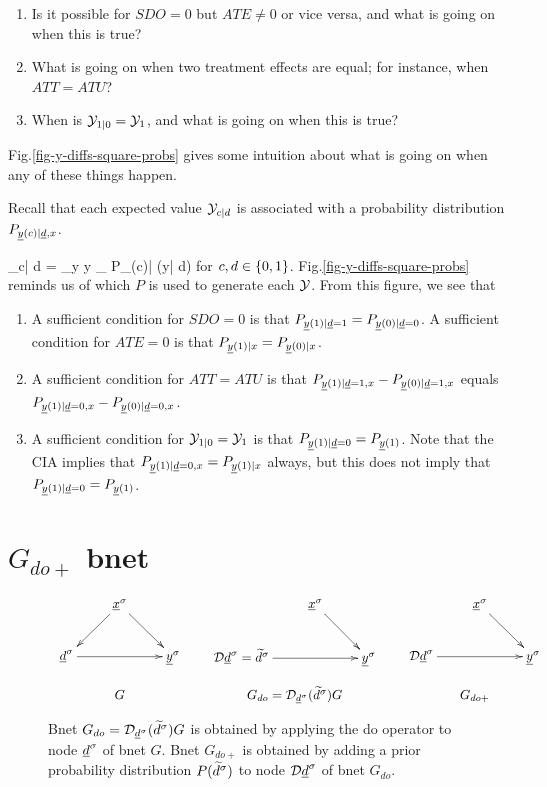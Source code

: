 \begin{enumerate}
\item
Is it
possible for $SDO=0$ but $ATE\neq 0$
or vice versa, and
what is going on when this is true?
\item
What is going on when two treatment effects
are equal; for instance, when $ATT=ATU$?
\item
When is ${\cal Y}_{1|0}={\cal Y}_{1}$,
and what is going on when this is  true?
\end{enumerate}
Fig.\ref{fig-y-diffs-square-probs}
gives some
intuition
about what is
going on when any of these
things happen.

Recall that
each expected value
${\cal Y}_{c|d}$
is associated with a probability
distribution $P_{\rvy(c)|\rvd,x}$.

\beq
\caly_{c| d }
=
\sum_{y} y
_{
P_{\rvy(c)| \rvd}(y| d)}
\eeq
for $c,  d\in \{0,1\}$.
Fig.\ref{fig-y-diffs-square-probs}
reminds us of which $P$
is used to generate each ${\cal Y}$.
From this figure, we see that

\begin{enumerate}
\item
A sufficient
condition for $SDO=0$
is that
$P_{\rvy(1)| \rvd=1}
=
P_{\rvy(0)| \rvd=0}$.
A sufficient
condition for $ATE=0$
is that
$P_{\rvy(1)|x}
=
P_{\rvy(0)|x}$.

\item
A sufficient condition for
$ATT=ATU$
is that
$P_{\rvy(1)| \rvd=1,x}
-
P_{\rvy(0)| \rvd=1,x}$
equals
$P_{\rvy(1)| \rvd=0,x}
-
P_{\rvy(0)| \rvd=0,x}$.
\item
A sufficient condition for ${\cal Y}_{1|0}={\cal Y}_{1}$
is that
$P_{\rvy(1)| \rvd=0}=
P_{\rvy(1)}$. Note that
the CIA implies that
$P_{\rvy(1)| \rvd=0,x}=
P_{\rvy(1)|x}$ always,
but this does not imply that
$P_{\rvy(1)| \rvd=0}=
P_{\rvy(1)}$.
\end{enumerate}


\section{$G_{do+}$  bnet}
\begin{figure}[h!]
$$
\begin{array}{ccccc}
\xymatrix{
&\rvx^\s\ar[dr]\ar[dl]
\\
\rvd^\s\ar[rr]&&\rvy^\s
}
&&
\xymatrix{
&\rvx^\s\ar[dr]
\\
\cald\rvd^\s=\td^\s\ar[rr]&&\rvy^\s
}
&&
\xymatrix{
&\rvx^\s\ar[dr]
\\
\cald\rvd^\s\ar[rr]&&\rvy^\s
}
\\
\\
G&&G_{do}= \cald_{\rvd^\s}
(\td^\s)G&& G_{do+}
\end{array}
$$
\caption{Bnet $G_{do}= \cald_{\rvd^\s}
(\td^\s)G$
is obtained by applying
the do operator to node $\rvd^\s$
of bnet $G$. Bnet $ G_{do+}$
is obtained
by adding a prior
probability distribution $P({{\widetilde{d}}}^\sigma)$
to node $\cald\rvd^\s$ of
bnet $G_{do}$.}
\label{fig-po-G-do}
\end{figure}

